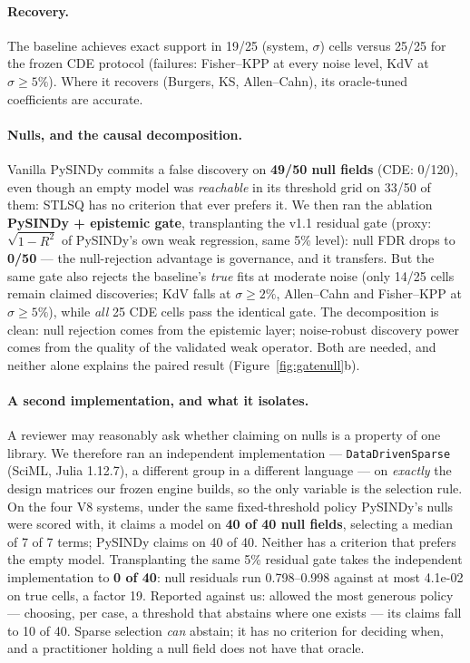 \documentclass[11pt]{article}
\begin{document}
\paragraph{Recovery.} The baseline achieves exact support in 19/25 (system, $\sigma$) cells versus 25/25 for the frozen CDE protocol (failures: Fisher--KPP at every noise level, KdV at $\sigma \geq 5\%$). Where it recovers (Burgers, KS, Allen--Cahn), its oracle-tuned coefficients are accurate.

\paragraph{Nulls, and the causal decomposition.} Vanilla PySINDy commits a false discovery on \textbf{49/50 null fields} (CDE: 0/120), even though an empty model was \emph{reachable} in its threshold grid on 33/50 of them: STLSQ has no criterion that ever prefers it. We then ran the ablation \textbf{PySINDy + epistemic gate}, transplanting the v1.1 residual gate (proxy: $\sqrt{1 - R^2}$ of PySINDy's own weak regression, same 5\% level): null FDR drops to \textbf{0/50} --- the null-rejection advantage is governance, and it transfers. But the same gate also rejects the baseline's \emph{true} fits at moderate noise (only 14/25 cells remain claimed discoveries; KdV falls at $\sigma \geq 2\%$, Allen--Cahn and Fisher--KPP at $\sigma \geq 5\%$), while \emph{all} 25 CDE cells pass the identical gate. The decomposition is clean: null rejection comes from the epistemic layer; noise-robust discovery power comes from the quality of the validated weak operator. Both are needed, and neither alone explains the paired result (Figure~\ref{fig:gatenull}b).

\paragraph{A second implementation, and what it isolates.} A reviewer may reasonably ask
whether claiming on nulls is a property of one library. We therefore ran an independent
implementation --- \texttt{DataDrivenSparse} (SciML, Julia 1.12.7), a different group in a
different language --- on \emph{exactly} the design matrices our frozen engine builds, so the
only variable is the selection rule. On the four V8 systems, under the same fixed-threshold
policy PySINDy's nulls were scored with, it claims a model on \textbf{40
of 40 null fields}, selecting a median of 7 of 7 terms; PySINDy claims on
40 of 40. Neither has a criterion that prefers the empty model. Transplanting
the same 5\% residual gate takes the independent implementation to
\textbf{0 of 40}: null residuals run
0.798--0.998 against at most 4.1e-02 on true cells, a
factor 19. Reported against us: allowed the most generous
policy --- choosing, per case, a threshold that abstains where one exists --- its claims fall to
10 of 40. Sparse selection \emph{can} abstain; it has
no criterion for deciding when, and a practitioner holding a null field does not have that
oracle.
\end{document}
